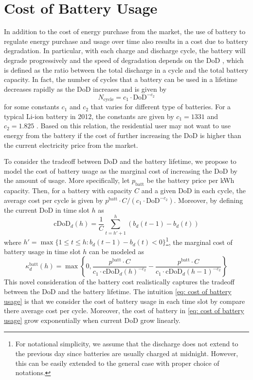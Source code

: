 \section{Cost of Battery Usage}\label{sec: Cost of Battery Usage}

In addition to the cost of energy purchase from the market, the use of battery to regulate energy purchase and usage over time also results in a cost due to battery degradation. In particular, with each charge and discharge cycle, the battery will degrade progressively and the speed of degradation depends on the DoD \cite{linden:1865}, which is defined as the ratio between the total discharge in a cycle and the total battery capacity. In fact, the number of cycles that a battery can be used in a lifetime decreases rapidly as the DoD increases and is given by \cite{dallinger:2013}
\begin{equation}
  N_\text{cycle} = c_1 \cdot \text{DoD}^{-c_2}
\end{equation}
for some constants $c_1$ and $c_2$ that varies for different type of batteries. For a typical Li-ion battery in 2012, the constants are given by $c_1 = 1331$ and $c_2 = 1.825$ \cite{dallinger:2013}. Based on this relation, the residential user may not want to use energy from the battery if the cost of further increasing the DoD is higher than the current electricity price from the market.

To consider the tradeoff between DoD and the battery lifetime, we propose to model the cost of battery usage as the marginal cost of increasing the DoD by the amount of usage. More specifically, let $p_{\text{batt}}$ be the battery price per kWh capacity. Then, for a battery with capacity $C$ and a given DoD in each cycle, the average cost per cycle is given by ${p^\text{batt}\cdot C}/{( c_1 \cdot \text{DoD}^{-c_2})}$. Moreover, by defining the current DoD in time slot $h$ as
\begin{equation}
    \text{cDoD}_d(h)=\frac{1}{C}\sum_{t=h'+1}^h \left(b_{d}(t-1)- b_d(t)\right)
\end{equation}
where $h'=\max\{1\leq t\leq h:b_{d}(t-1)-b_{d}(t)<0\}$\footnote{For notational simplicity, we assume that the discharge does not extend to the previous day since batteries are usually charged at midnight. However, this can be easily extended to the general case with proper choice of notations.}, the marginal cost of battery usage in time slot $h$ can be modeled as
\begin{equation}\label{eq: cost of battery usage}
    \kappa^\text{batt}_d(h) = \max\left\{0, \frac{p^\text{batt}\cdot C}{c_1\cdot\text{cDoD}_d(h)^{-c_2}}-\frac{p^\text{batt}\cdot C}{c_1\cdot\text{cDoD}_d(h-1)^{-c_2}}\right\}
\end{equation}
This novel consideration of the battery cost realistically captures the tradeoff between the DoD and the battery lifetime. The intuition \eqref{eq: cost of battery usage} is that we consider the cost of battery usage in each time slot by compare there average cost per cycle. Moreover, the cost of battery in \eqref{eq: cost of battery usage} grow exponentially when current DoD grow linearly.

